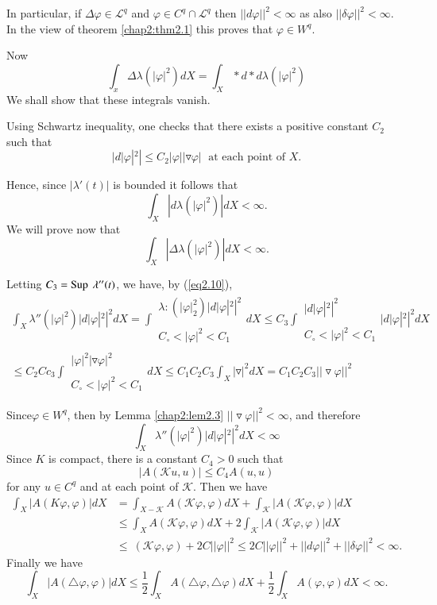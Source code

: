 In particular, if $\Delta \varphi \in \mathcal{L}^q$ and $\varphi \in
C^q \cap \mathcal{L}^q $ then $||d \varphi ||^2 < \infty$ as also
$||\delta \varphi ||^2< \infty$. In the view of theorem \ref{chap2:thm2.1} this
proves that $\varphi \in W^q$. 

Now
$$
\int_x \Delta \lambda (|\varphi|^2)dX=\int_X*d*d \lambda (|\varphi|^2)
$$
We shall show that these integrals vanish.

Using Schwartz inequality, one checks that there exists a positive
constant $C_2$ such that 
\begin{equation*}
  |d|\varphi|^2|\leqslant  C_2|\varphi||\triangledown \varphi| \;
  \text{ at each point of $X$.}    \tag{2.10}\label{eq2.10} 
\end{equation*}

Hence, since $|\lambda'(t)|$ is bounded it follows that
$$
\int_X|d \lambda(|\varphi|^2)|dX<\infty. 
$$
We will prove now that
$$
\int_X|\Delta \lambda(|\varphi |^2)|dX < \infty.
$$

Letting $C_3= \operatorname{Sup}~\lambda''(t)$, we have, by (\ref{eq2.10}),
\begin{multline*}
  \int_X \lambda''(|\varphi|^2)|d|\varphi|^2|^2dX=\int
  \substack{\lambda:(|\varphi|^2_2)|d|\varphi|^2|^2 \\\\ C_\circ
    <|\varphi|^2 < C_1}  dX \leqslant C_3 \int \substack
           {|d|\varphi|^2|^2 \\\\C_\circ <|\varphi|^2 <
             C_1}|d|\varphi|^2|^2 dX \\
  \leqslant C_2Cc_3  \int \substack{|\varphi|^2 |\triangledown
    \varphi|^2 \\\\ C_\circ <|\varphi|^2 < C_1} dX \leqslant C_1C_2C_3
  \int_X |\triangledown|^2 dX=C_1C_2C_3|| \triangledown \varphi||^2
\end{multline*}

Since\pageoriginale $\varphi \in W^{q}$, then by Lemma
\ref{chap2:lem2.3}  $||\triangledown 
\varphi ||^2 < \infty$, and therefore 
$$
\int_X \lambda''(|\varphi|^2)|d|\varphi|^2|^2 dX< \infty
$$
Since $K$ is compact, there is a constant $C_4 >0$ such that
$$
|A (\mathcal{K} u,u)|\leqslant C_4 A(u,u)
$$
for any $u\in C^q$ and at each point of $\mathcal{K}$. Then we have
\begin{align*}
  \int_X|A(K \varphi, \varphi)|dX & = \int_{X-\mathcal{K}}A(\mathcal{K} \varphi,
  \varphi)dX + \int_\mathcal{K} |A(\mathcal{K} \varphi, \varphi)|dX\\ 
  & \leqslant \int_X A(\mathcal{K} \varphi, \varphi)dX +2
  \int_\mathcal{K} |A(\mathcal{K} \varphi,   \varphi)|dX\\ 
  & \leqslant~(\mathcal{K} \varphi, \varphi)+2C||\varphi||^2 \leqslant
  2C||\varphi ||^2+||d \varphi||^2 + ||\delta \varphi||^2 <\infty. 
\end{align*}
Finally we have
$$
\int_X |A(\triangle \varphi, \varphi)|dX \le \frac{1}{2} \int_X
A(\triangle \varphi,\triangle \varphi)dX +\frac{1}{2} \int_X
A(\varphi, \varphi)dX < \infty.
$$

